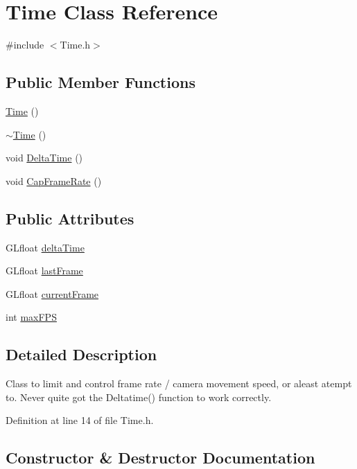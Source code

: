 \hypertarget{class_time}{}\section{Time Class Reference}
\label{class_time}


{\ttfamily \#include $<$Time.\+h$>$}

\subsection*{Public Member Functions}
\begin{DoxyCompactItemize}
\item 
\hyperlink{class_time_a4245e409c7347d1d671858962c2ca3b5}{Time} ()
\item 
\hyperlink{class_time_a1e92dbe963fa3cdd6bea207680f5f6d1}{$\sim$\+Time} ()
\item 
void \hyperlink{class_time_a385b4c0869ed969b266535ae835d135d}{Delta\+Time} ()
\item 
void \hyperlink{class_time_a8ccf48d1b779c21143c0a96c2574514e}{Cap\+Frame\+Rate} ()
\end{DoxyCompactItemize}
\subsection*{Public Attributes}
\begin{DoxyCompactItemize}
\item 
G\+Lfloat \hyperlink{class_time_a7dd93631e77477e08954476b0f56f013}{delta\+Time}
\item 
G\+Lfloat \hyperlink{class_time_adda8e3dcf090474f66b60ba354843270}{last\+Frame}
\item 
G\+Lfloat \hyperlink{class_time_a8f870e4dd1a743941cd40c80c3dc86e0}{current\+Frame}
\item 
int \hyperlink{class_time_a1ea63396edff67d5069ab9dd2e8f3c44}{max\+F\+P\+S}
\end{DoxyCompactItemize}


\subsection{Detailed Description}
Class to limit and control frame rate / camera movement speed, or aleast atempt to. Never quite got the {\ttfamily Deltatime()} function to work correctly. 

Definition at line 14 of file Time.\+h.



\subsection{Constructor \& Destructor Documentation}
\hypertarget{class_time_a4245e409c7347d1d671858962c2ca3b5}{}
